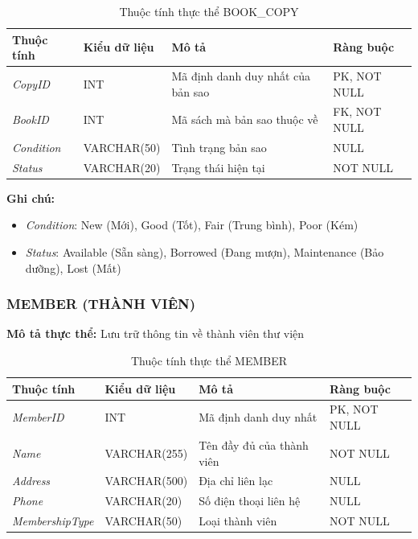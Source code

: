 \documentclass[12pt,a4paper]{article}
\newcommand{\attr}[1]{\textit{#1}}
\begin{document}
\begin{table}[H]
\centering
\caption{Thuộc tính thực thể BOOK\_COPY}
\begin{tabular}{@{}|l|l|p{6cm}|l|@{}}
\hline
\textbf{Thuộc tính} & \textbf{Kiểu dữ liệu} & \textbf{Mô tả} & \textbf{Ràng buộc} \\ \hline
\attr{CopyID} & INT & Mã định danh duy nhất của bản sao & PK, NOT NULL \\ \hline
\attr{BookID} & INT & Mã sách mà bản sao thuộc về & FK, NOT NULL \\ \hline
\attr{Condition} & VARCHAR(50) & Tình trạng bản sao & NULL \\ \hline
\attr{Status} & VARCHAR(20) & Trạng thái hiện tại & NOT NULL \\ \hline
\end{tabular}
\end{table}

\textbf{Ghi chú:}
\begin{itemize}
    \item \attr{Condition}: New (Mới), Good (Tốt), Fair (Trung bình), Poor (Kém)
    \item \attr{Status}: Available (Sẵn sàng), Borrowed (Đang mượn), Maintenance (Bảo dưỡng), Lost (Mất)
\end{itemize}

\subsubsection{MEMBER (THÀNH VIÊN)}

\textbf{Mô tả thực thể:} Lưu trữ thông tin về thành viên thư viện

\begin{table}[H]
\centering
\caption{Thuộc tính thực thể MEMBER}
\begin{tabular}{@{}|l|l|p{6cm}|l|@{}}
\hline
\textbf{Thuộc tính} & \textbf{Kiểu dữ liệu} & \textbf{Mô tả} & \textbf{Ràng buộc} \\ \hline
\attr{MemberID} & INT & Mã định danh duy nhất & PK, NOT NULL \\ \hline
\attr{Name} & VARCHAR(255) & Tên đầy đủ của thành viên & NOT NULL \\ \hline
\attr{Address} & VARCHAR(500) & Địa chỉ liên lạc & NULL \\ \hline
\attr{Phone} & VARCHAR(20) & Số điện thoại liên hệ & NULL \\ \hline
\attr{MembershipType} & VARCHAR(50) & Loại thành viên & NOT NULL \\ \hline
\end{tabular}
\end{table}
\end{document}
